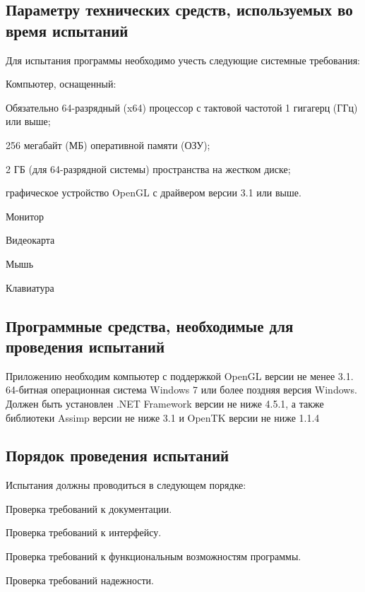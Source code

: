 \subsection{Параметру технических средств, используемых во время испытаний}
Для испытания программы необходимо учесть следующие системные требования:
\begin{my_enumerate}
\item Компьютер, оснащенный:
    \begin{my_enumerate}
    \item Обязательно 64-разрядный (x64) процессор с тактовой частотой 1 гигагерц (ГГц) или выше;
    \item 256 мегабайт (МБ) оперативной памяти (ОЗУ);
    \item 2 ГБ (для 64-разрядной системы) пространства на жестком диске;
    \item графическое устройство OpenGL с драйвером версии 3.1 или выше.
    \end{my_enumerate}
\item Монитор
\item Видеокарта
\item Мышь
\item Клавиатура
\end{my_enumerate}


\subsection{Программные средства, необходимые для проведения испытаний}
Приложению необходим компьютер с поддержкой OpenGL версии не менее 3.1. 64-битная операционная система Windows 7 или более поздняя версия Windows. Должен быть установлен .NET Framework версии не ниже 4.5.1, а также библиотеки Assimp версии не ниже 3.1 и OpenTK версии не ниже 1.1.4

\subsection{Порядок проведения испытаний}
Испытания должны проводиться в следующем порядке:
\begin{my_enumerate}
\item Проверка требований к документации.
\item Проверка требований к интерфейсу.
\item Проверка требований к функциональным возможностям программы.
\item Проверка требований надежности.
\end{my_enumerate}



